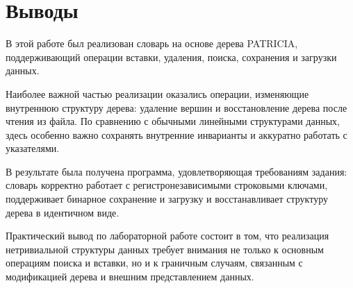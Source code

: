 \section{Выводы}

В этой работе был реализован словарь на основе дерева PATRICIA, поддерживающий операции вставки, удаления, поиска, сохранения и загрузки данных.

Наиболее важной частью реализации оказались операции, изменяющие внутреннюю структуру дерева: удаление вершин и восстановление дерева после чтения из файла. По сравнению с обычными линейными структурами данных, здесь особенно важно сохранять внутренние инварианты и аккуратно работать с указателями.

В результате была получена программа, удовлетворяющая требованиям задания: словарь корректно работает с регистронезависимыми строковыми ключами, поддерживает бинарное сохранение и загрузку и восстанавливает структуру дерева в идентичном виде.

Практический вывод по лабораторной работе состоит в том, что реализация нетривиальной структуры данных требует внимания не только к основным операциям поиска и вставки, но и к граничным случаям, связанным с модификацией дерева и внешним представлением данных.
\pagebreak
